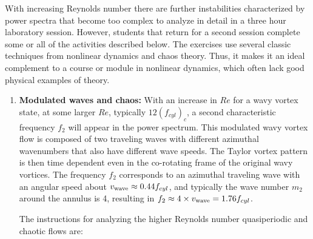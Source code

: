 \documentclass[%
 amsmath,amssymb,
 aps,
floatfix,
aps,prd,longbibliography,
notitlepage
]{revtex4-1}
\begin{document}
With increasing Reynolds number there are further instabilities characterized by power spectra that become too complex to analyze in detail in a three hour laboratory session.  However, students that return for a second session complete some or all of the activities described below. The exercises use several classic techniques from nonlinear dynamics and chaos theory. Thus, it makes it an ideal complement to a course or module in nonlinear dynamics, which often lack good physical examples of theory.

\begin{enumerate}

\item \textbf{Modulated waves and chaos:} With an increase in $Re$ for a wavy vortex state, at some larger $Re$, typically $12( f_{cyl})_c$, a second characteristic frequency $f_2$ will appear in the power spectrum. This modulated wavy vortex flow is composed of two traveling waves with different azimuthal wavenumbers that also have different wave speeds. The Taylor vortex pattern is then time dependent even in the co-rotating frame of the original wavy vortices.  The frequency $f_2$ corresponds to an azimuthal traveling wave with an angular speed about $v_{\rm wave}\approx0.44f_{cyl}$, and typically the wave number $m_2$ around the annulus is 4, resulting in $f_2 \approx 4\times v_{\rm wave}= 1.76 f_{cyl}$.  

The instructions for analyzing the higher Reynolds number quasiperiodic and chaotic flows are:


\end{enumerate}
\end{document}
